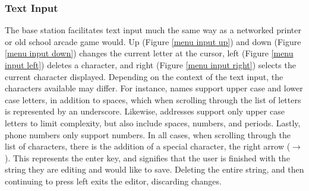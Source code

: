 \documentclass[journal,compsoc]{IEEEtran}
\begin{document}
\subsubsection{Text Input}

The base station facilitates text input much the same way as a networked printer or old school arcade game would. Up (Figure \ref{menu input up}) and down (Figure \ref{menu input down}) changes the current letter at the cursor, left (Figure \ref{menu input left}) deletes a character, and right (Figure \ref{menu input right}) selects the current character displayed. Depending on the context of the text input, the characters available may differ. For instance, names support upper case and lower case letters, in addition to spaces, which when scrolling through the list of letters is represented by an underscore. Likewise, addresses support only upper case letters to limit complexity, but also include spaces, numbers, and periods. Lastly, phone numbers only support numbers. In all cases, when scrolling through the list of characters, there is the addition of a special character, the right arrow ($\rightarrow$). This represents the enter key, and signifies that the user is finished with the string they are editing and would like to save. Deleting the entire string, and then continuing to press left exits the editor, discarding changes.
\end{document}
